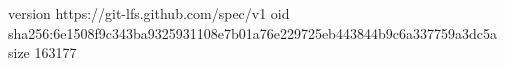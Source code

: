 version https://git-lfs.github.com/spec/v1
oid sha256:6e1508f9c343ba9325931108e7b01a76e229725eb443844b9c6a337759a3dc5a
size 163177
